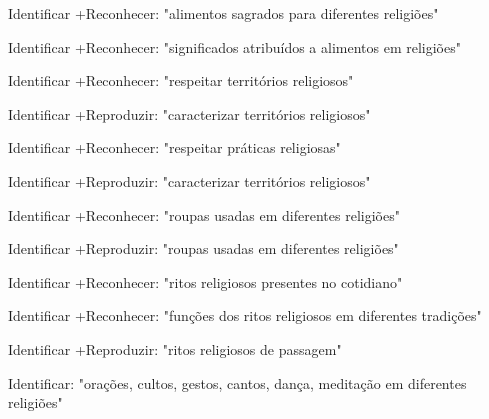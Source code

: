  Identificar +Reconhecer: "alimentos sagrados para diferentes religiões"

 Identificar +Reconhecer: "significados atribuídos a alimentos em religiões"

 Identificar +Reconhecer: "respeitar territórios religiosos"

 Identificar +Reproduzir: "caracterizar territórios religiosos"

 Identificar +Reconhecer: "respeitar práticas religiosas"

 Identificar +Reproduzir: "caracterizar territórios religiosos"

 Identificar +Reconhecer: "roupas usadas em diferentes religiões"

 Identificar +Reproduzir: "roupas usadas em diferentes religiões"

 Identificar +Reconhecer: "ritos religiosos presentes no cotidiano"

 Identificar +Reconhecer: "funções dos ritos religiosos em diferentes tradições"

 Identificar +Reproduzir: "ritos religiosos de passagem"

 Identificar: "orações, cultos, gestos, cantos, dança, meditação em diferentes religiões"

